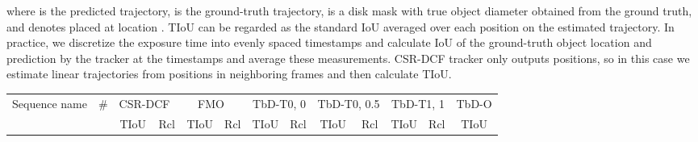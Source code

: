 \documentclass[10pt,twocolumn,letterpaper]{article}
\begin{document}
where  is the predicted trajectory,  is the ground-truth trajectory,  is a disk mask with true object diameter obtained from the ground truth, and  denotes  placed at location . TIoU can be regarded as the standard IoU averaged over each position on the estimated trajectory. In practice, we discretize the exposure time into evenly spaced timestamps and calculate IoU of the ground-truth object location and prediction by the tracker at the timestamps and average these measurements. CSR-DCF tracker only outputs positions, so in this case we estimate linear trajectories from positions in neighboring frames and then calculate TIoU.

\begin{table*}
\begin{center}
\begin{tabular}{l|r|c|c|c|c|c|c|c|c|c|c|c}
\hline
\multirow{2}{*}{Sequence name} & \multirow{2}{*}{\#} & \multicolumn{2}{c|}{CSR-DCF~\cite{csrdcf}}  & \multicolumn{2}{c|}{FMO~\cite{fmo}} & \multicolumn{2}{c|}{TbD-T0, 0} & \multicolumn{2}{c|}{TbD-T0, 0.5} & \multicolumn{2}{c|}{TbD-T1, 1} & TbD-O \\  \cline{3-13}
 & & TIoU & Rcl & TIoU & Rcl & TIoU & Rcl & TIoU & Rcl & TIoU & Rcl & TIoU \\ \hline


\end{tabular}
\end{center}
\end{table*}
\end{document}
